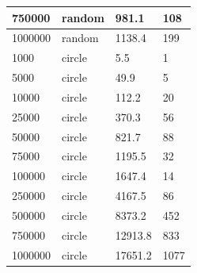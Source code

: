 \documentclass[12pt]{article}
\begin{document}
\begin{table}[h!]
\begin{tabular}{|l|l|l|l|}
750000  & random & 981.1                     & 108               \\ \hline
1000000 & random & 1138.4                    & 199               \\ \hline
1000    & circle & 5.5                       & 1                 \\ \hline
5000    & circle & 49.9                      & 5                 \\ \hline
10000   & circle & 112.2                     & 20                \\ \hline
25000   & circle & 370.3                     & 56                \\ \hline
50000   & circle & 821.7                     & 88                \\ \hline
75000   & circle & 1195.5                    & 32                \\ \hline
100000  & circle & 1647.4                    & 14                \\ \hline
250000  & circle & 4167.5                    & 86                \\ \hline
500000  & circle & 8373.2                    & 452               \\ \hline
750000  & circle & 12913.8                   & 833               \\ \hline
1000000 & circle & 17651.2                   & 1077              \\ \hline
\end{tabular}
\end{table}
\end{document}
